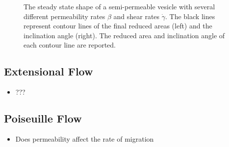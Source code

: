 \documentclass[aps,prl,showpacs]{revtex4}
\newif\ifTikz
\begin{document}
\begin{figure}[htp]
\ifTikz
 
 
\fi
  \caption{\label{fig:shearPhase} The steady state shape of a
  semi-permeable vesicle with several different permeability rates
  $\beta$ and shear rates $\dot{\gamma}$. The black lines represent
  contour lines of the final reduced areas (left) and the inclination
  angle (right). The reduced area and inclination angle of each
  contour line are reported.}
\end{figure}



\subsection{Extensional Flow}
\begin{itemize}
  \item ???
\end{itemize}

%

\subsection{Poiseuille Flow}
\begin{itemize}
  \item Does permeability affect the rate of migration
\end{itemize}




 
 
\end{document}
